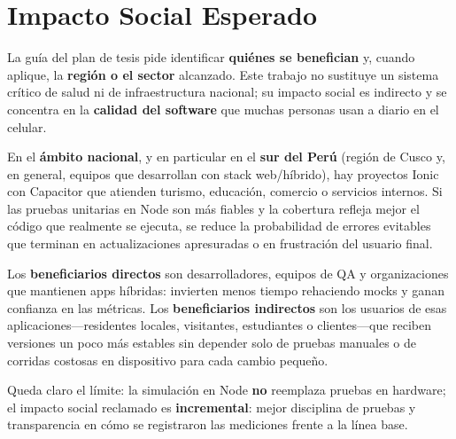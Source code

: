 \section{Impacto Social Esperado}
\label{chap:impacto_social}

La guía del plan de tesis pide identificar \textbf{quiénes se benefician} y, cuando aplique, la \textbf{región o el sector} alcanzado. Este trabajo no sustituye un sistema crítico de salud ni de infraestructura nacional; su impacto social es indirecto y se concentra en la \textbf{calidad del software} que muchas personas usan a diario en el celular.

En el \textbf{ámbito nacional}, y en particular en el \textbf{sur del Perú} (región de Cusco y, en general, equipos que desarrollan con stack web/híbrido), hay proyectos Ionic con Capacitor que atienden turismo, educación, comercio o servicios internos. Si las pruebas unitarias en Node son más fiables y la cobertura refleja mejor el código que realmente se ejecuta, se reduce la probabilidad de errores evitables que terminan en actualizaciones apresuradas o en frustración del usuario final.

Los \textbf{beneficiarios directos} son desarrolladores, equipos de QA y organizaciones que mantienen apps híbridas: invierten menos tiempo rehaciendo mocks y ganan confianza en las métricas. Los \textbf{beneficiarios indirectos} son los usuarios de esas aplicaciones---residentes locales, visitantes, estudiantes o clientes---que reciben versiones un poco más estables sin depender solo de pruebas manuales o de corridas costosas en dispositivo para cada cambio pequeño.

Queda claro el límite: la simulación en Node \textbf{no} reemplaza pruebas en hardware; el impacto social reclamado es \textbf{incremental}: mejor disciplina de pruebas y transparencia en cómo se registraron las mediciones frente a la línea base.
